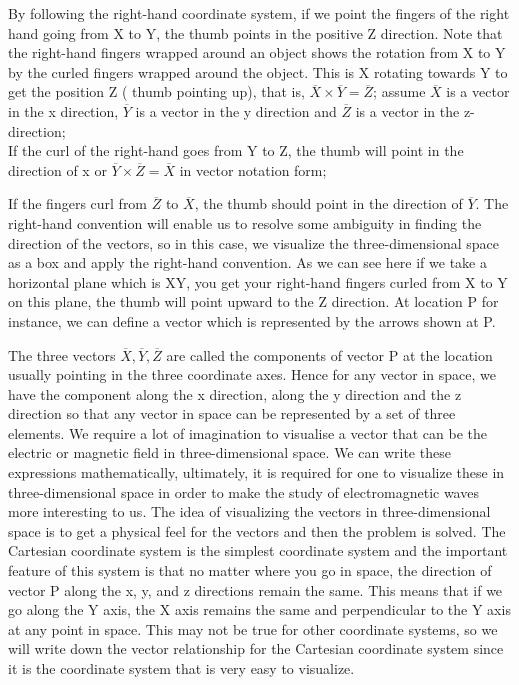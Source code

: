 By following the right-hand coordinate system, if we point the fingers of the right hand going from X to Y, the thumb points in the positive Z direction. Note that the right-hand fingers wrapped around an object shows the rotation from X to Y by the curled fingers wrapped around the object. This is X rotating towards Y to get the position Z ( thumb pointing up), that is, $\overline{X} \times \overline{Y} = \overline{Z}$; assume  $\overline{X}$ is a vector in the x direction, $\overline{Y}$ is a vector in the y direction and $\overline{Z}$ is a vector in the z-direction;\\If the curl of the right-hand goes from Y to Z, the thumb will point in the direction of x or $\overline{Y} \times \overline{Z} = \overline{X}$ in vector notation form;

If the fingers curl from $\overline{Z}$ to $\overline{X}$, the thumb should point in the direction of $\overline{Y}$. The right-hand convention will enable us to resolve some ambiguity in finding the direction of the vectors, so in this case, we visualize the three-dimensional space as a box and apply the right-hand convention. As we can see here if we take a horizontal plane which is XY, you get your right-hand fingers curled from X to Y on this plane, the thumb will point upward to the Z direction. At location P for instance, we can define a vector which is represented by the arrows shown at P.

The three vectors \textbf{$\overline{X},\overline{Y}, \overline{Z}$} are called the components of vector P at the location usually pointing in the three coordinate axes. Hence for any vector in space, we have the component along the x direction, along the y direction and the z direction so that any vector in space can be represented by a set of three elements. We require a lot of imagination to visualise a vector that can be the electric or magnetic field in three-dimensional space. We can write these expressions mathematically, ultimately, it is required for one to visualize these in three-dimensional space in order to make the study of electromagnetic waves more interesting to us. The idea of visualizing the vectors in three-dimensional space is to get a physical feel for the vectors and then the problem is solved. The Cartesian coordinate system is the simplest coordinate system and the important feature of this system is that no matter where you go in space, the direction of vector P along the x, y, and z directions remain the same. This means that if we go along the Y axis, the X axis remains the same and perpendicular to the Y axis at any point in space. This may not be true for other coordinate systems, so we will write down the vector relationship for the Cartesian coordinate system since it is the coordinate system that is very easy to visualize. 

